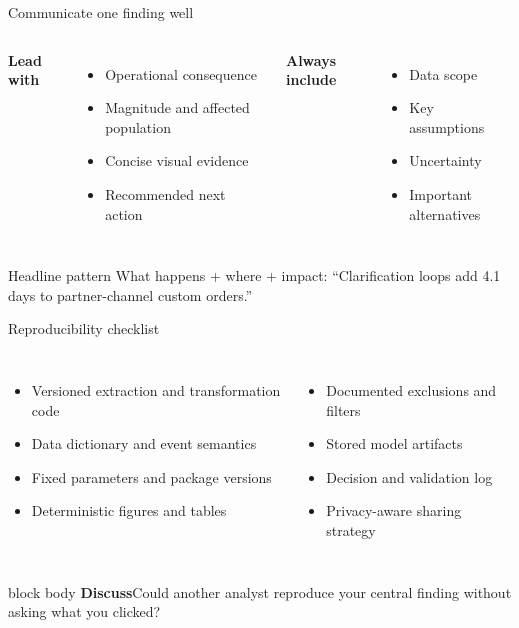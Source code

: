 \documentclass[aspectratio=169,11pt]{beamer}
\newcommand{\promptbox}[1]{%
  \begin{beamercolorbox}[rounded=true,sep=0.65em]{block body}
    \textbf{\color{Coral}Discuss}\quad #1
  \end{beamercolorbox}
}
\begin{document}
\begin{frame}{Communicate one finding well}
  \begin{columns}[T,onlytextwidth]
      \textbf{Lead with}
      \begin{itemize}
        \item Operational consequence
        \item Magnitude and affected population
        \item Concise visual evidence
        \item Recommended next action
      \end{itemize}
      \textbf{Always include}
      \begin{itemize}
        \item Data scope
        \item Key assumptions
        \item Uncertainty
        \item Important alternatives
      \end{itemize}
  \end{columns}
  \vspace{0.45cm}
  \begin{block}{Headline pattern}
    \alert{What happens} + \alert{where} + \alert{impact}: ``Clarification loops
    add 4.1 days to partner-channel custom orders.''
  \end{block}
\end{frame}

\begin{frame}{Reproducibility checklist}
  \begin{columns}[T,onlytextwidth]
      \begin{itemize}
        \item Versioned extraction and transformation code
        \item Data dictionary and event semantics
        \item Fixed parameters and package versions
        \item Deterministic figures and tables
      \end{itemize}
      \begin{itemize}
        \item Documented exclusions and filters
        \item Stored model artifacts
        \item Decision and validation log
        \item Privacy-aware sharing strategy
      \end{itemize}
  \end{columns}
  \vspace{0.5cm}
  \promptbox{Could another analyst reproduce your central finding without asking
  what you clicked?}
\end{frame}
\end{document}
